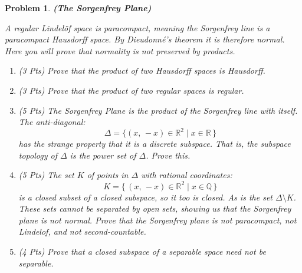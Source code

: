 \documentclass{article}
\theoremstyle{normal}
\newtheorem{problem}{Problem}
\begin{document}
    \begin{problem}
        \textbf{(The Sorgenfrey Plane)}
        \par\hfill\par
        A regular Lindel\"{o}f space is paracompact, meaning the Sorgenfrey
        line is a paracompact Hausdorff space. By Dieudonn\'{e}'s theorem it
        is therefore normal. Here you will prove that normality is not
        preserved by products.
        \begin{enumerate}
            \item (3 Pts) Prove that the product of two Hausdorff spaces is
                Hausdorff.
            \item (3 Pts) Prove that the product of two regular spaces is
                regular.
            \item (5 Pts) The Sorgenfrey Plane is the product of the Sorgenfrey
                line with itself. The anti-diagonal:
                \begin{equation}
                    \Delta=\{(x,\,-x)\in\mathbb{R}^{2}\;|\;x\in\mathbb{R}\,\}
                \end{equation}
                has the strange property that it is a discrete subspace. That
                is, the subspace topology of $\Delta$ is the power set of
                $\Delta$. Prove this.
            \item (5 Pts) The set $K$ of points in $\Delta$ with rational
                coordinates:
                \begin{equation}
                    K=\{\,(x,\,-x)\in\mathbb{R}^{2}\;|\;x\in\mathbb{Q}\,\}
                \end{equation}
                is a closed subset of a closed subspace, so it too is closed.
                As is the set $\Delta\setminus{K}$. These sets cannot be
                separated by open sets, showing us that the Sorgenfrey plane
                is not normal. Prove that the Sorgenfrey plane is not
                paracompact, not Lindel{o}f, and not second-countable.
            \item (4 Pts) Prove that a closed subspace of a separable space
                need not be separable.
        \end{enumerate}
    \end{problem}
\end{document}
